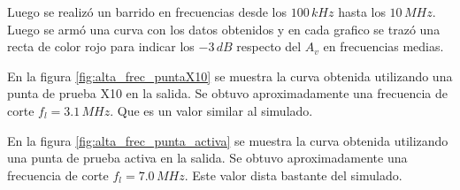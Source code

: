 \documentclass[10pt,spanish,a4paper,notitlepage]{article}
\begin{document}
Luego se realizó un barrido en frecuencias desde los $100\,\unit{kHz}$ hasta los
$10\,\unit{MHz}$. Luego se armó una curva con los datos obtenidos y en cada
grafico se trazó una recta de color rojo para indicar
los $-3\,\unit{dB}$ respecto del $A_v$ en frecuencias medias.

En la figura \ref{fig:alta_frec_puntaX10} se muestra la curva obtenida utilizando
una punta de prueba X10 en la salida. Se obtuvo aproximadamente una frecuencia de corte
$f_l = 3.1\,\unit{MHz}$. Que es un valor similar al simulado.

En la figura \ref{fig:alta_frec_punta_activa} se muestra la curva obtenida utilizando
una punta de prueba activa en la salida. Se obtuvo aproximadamente una frecuencia de corte
$f_l = 7.0\,\unit{MHz}$. Este valor dista bastante del simulado.
\end{document}
